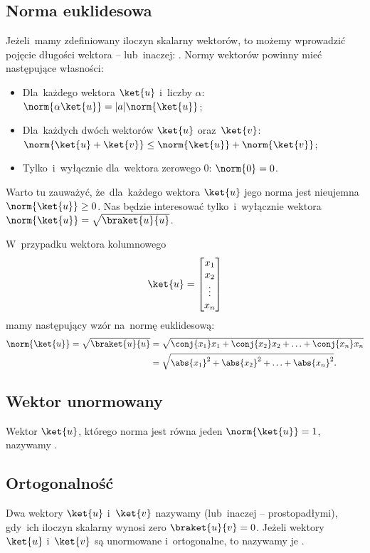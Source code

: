 \subsection{Norma euklidesowa}
Jeżeli~mamy zdefiniowany iloczyn skalarny wektorów, to możemy wprowadzić pojęcie
długości wektora -- lub~inaczej: .
Normy wektorów powinny mieć następujące własności:
\begin{itemize}
	\item Dla~każdego wektora $\ket{u}$ i~liczby $\alpha$: $\norm{\alpha\ket{u}}=|a|\norm{\ket{u}}$;
	\item Dla~każdych dwóch wektorów $\ket{u}$ oraz~$\ket{v}$: $\norm{\ket{u}+\ket{v}}\leq \norm{\ket{u}}+\norm{\ket{v}}$;
	\item Tylko~i~wyłącznie dla~wektora zerowego $0$: $\norm{0}=0$.
\end{itemize}
Warto tu zauważyć, że~dla~każdego wektora $\ket{u}$ jego norma jest nieujemna
$\norm{\ket{u}}\geq 0$.
Nas będzie interesować tylko~i~wyłącznie  wektora
$\norm{\ket{u}}=\sqrt{\braket{u}{u}}$.

W~przypadku wektora kolumnowego
$$
	\ket{u}=
	\begin{bmatrix}
		x_1    \\
		x_2    \\
		\vdots \\
		x_{n}  \\
	\end{bmatrix}
$$
mamy następujący wzór na~normę euklidesową:
\begin{equation*}
	\begin{split}
		\norm{\ket{u}}=\sqrt{\braket{u}{u}}
		& = \sqrt{\conj{x_1}x_1 + \conj{x_2}x_2 + \ldots + \conj{x_n}x_n}  \\
		&= \sqrt{\abs{x_1}^2 + \abs{x_2}^2 + \ldots + \abs{x_n}^2}.
	\end{split}
\end{equation*}
\subsection{Wektor unormowany}
Wektor $\ket{u}$, którego norma jest równa jeden $\norm{\ket{u}}=1$, nazywamy
.

\subsection{Ortogonalność}
Dwa wektory $\ket{u}$ i~$\ket{v}$ nazywamy
 (lub~inaczej --
prostopadłymi), gdy~ich iloczyn skalarny wynosi zero $\braket{u}{v}=0$. Jeżeli
wektory $\ket{u}$ i~$\ket{v}$ są unormowane i~ortogonalne, to nazywamy je
.

